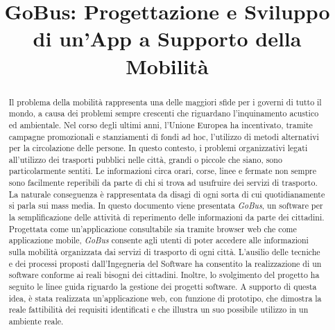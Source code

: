 \documentclass[conference]{IEEEtran}
\begin{document}
\title{GoBus: Progettazione e Sviluppo di un\rq App a Supporto della Mobilit\`{a}}

\author{}


\maketitle


\begin{abstract}
Il problema della mobilit\`{a} rappresenta una delle maggiori sfide per i governi di tutto il mondo, a causa dei problemi sempre crescenti che riguardano l\rq inquinamento acustico ed ambientale. Nel corso degli ultimi anni, l\rq Unione Europea ha incentivato, tramite campagne promozionali e stanziamenti di fondi ad hoc, l\rq utilizzo di metodi alternativi per la circolazione delle persone. In questo contesto, i problemi organizzativi legati all\rq utilizzo dei trasporti pubblici nelle citt\`{a}, grandi o piccole che siano, sono particolarmente sentiti. Le informazioni circa orari, corse, linee e fermate non sempre sono facilmente reperibili da parte di chi si trova ad usufruire dei servizi di trasporto. La naturale conseguenza \`{e} rappresentata da disagi di ogni sorta di cui quotidianamente si parla sui mass media. In questo documento viene presentata \emph{GoBus}, un software per la semplificazione delle attivit\`{a} di reperimento delle informazioni da parte dei cittadini. Progettata come un\rq applicazione consultabile sia tramite browser web che come applicazione mobile, \emph{GoBus} consente agli utenti di poter accedere alle informazioni sulla mobilit\`{a} organizzata dai servizi di trasporto di ogni citt\`{a}. L\rq ausilio delle tecniche e dei processi proposti dall\rq Ingegneria del Software ha consentito la realizzazione di un software conforme ai reali bisogni dei cittadini. Inoltre, lo svolgimento del progetto ha seguito le linee guida riguardo la gestione dei progetti software. A supporto di questa idea, \`{e} stata realizzata un\rq applicazione web, con funzione di prototipo, che dimostra la reale fattibilit\`{a} dei requisiti identificati e che illustra un suo possibile utilizzo in un ambiente reale.
\end{abstract}
\end{document}
